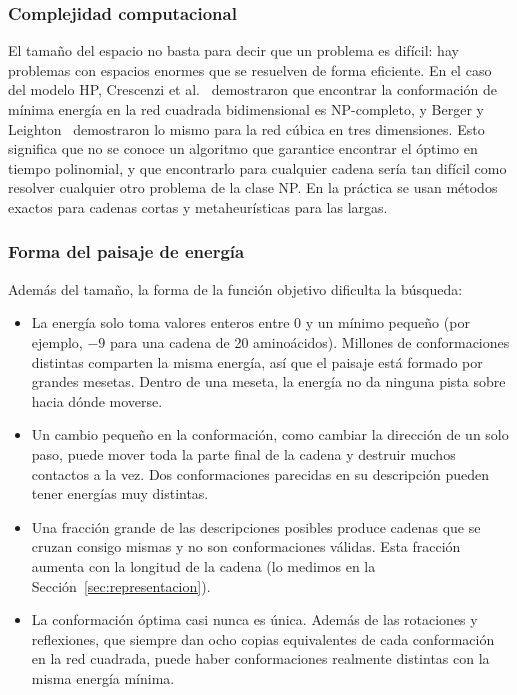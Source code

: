 \subsubsection{Complejidad computacional}

El tamaño del espacio no basta para decir que un problema es difícil: hay problemas con espacios enormes que se resuelven de forma eficiente. En el caso del modelo HP, Crescenzi et al.~\cite{crescenzi1998complexity} demostraron que encontrar la conformación de mínima energía en la red cuadrada bidimensional es NP-completo, y Berger y Leighton~\cite{berger1998protein} demostraron lo mismo para la red cúbica en tres dimensiones. Esto significa que no se conoce un algoritmo que garantice encontrar el óptimo en tiempo polinomial, y que encontrarlo para cualquier cadena sería tan difícil como resolver cualquier otro problema de la clase NP. En la práctica se usan métodos exactos para cadenas cortas y metaheurísticas para las largas.

\subsubsection{Forma del paisaje de energía}

Además del tamaño, la forma de la función objetivo dificulta la búsqueda:

\begin{itemize}
    \item La energía solo toma valores enteros entre 0 y un mínimo pequeño (por ejemplo, $-9$ para una cadena de 20 aminoácidos). Millones de conformaciones distintas comparten la misma energía, así que el paisaje está formado por grandes mesetas. Dentro de una meseta, la energía no da ninguna pista sobre hacia dónde moverse.
    \item Un cambio pequeño en la conformación, como cambiar la dirección de un solo paso, puede mover toda la parte final de la cadena y destruir muchos contactos a la vez. Dos conformaciones parecidas en su descripción pueden tener energías muy distintas.
    \item Una fracción grande de las descripciones posibles produce cadenas que se cruzan consigo mismas y no son conformaciones válidas. Esta fracción aumenta con la longitud de la cadena (lo medimos en la Sección~\ref{sec:representacion}).
    \item La conformación óptima casi nunca es única. Además de las rotaciones y reflexiones, que siempre dan ocho copias equivalentes de cada conformación en la red cuadrada, puede haber conformaciones realmente distintas con la misma energía mínima.
\end{itemize}

